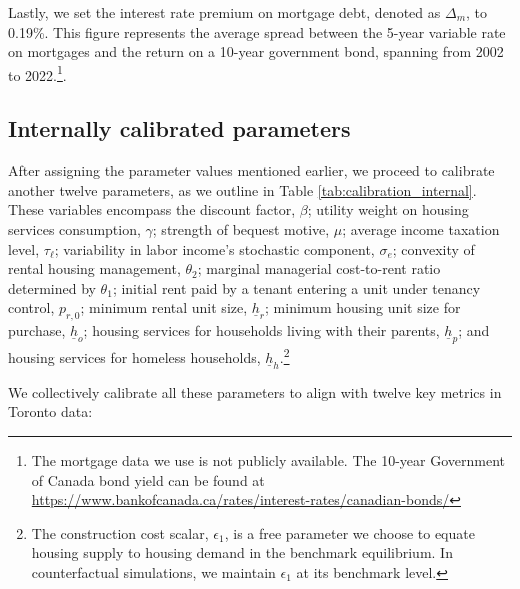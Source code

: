 \documentclass[parskip=full]{article}
\begin{document}
Lastly, we set the interest rate premium on mortgage debt, denoted as $\Delta_{m}$, to 0.19\%. This figure represents the average spread between the 5-year variable rate on mortgages and the return on a 10-year government bond, spanning from 2002 to 2022.\footnote{The mortgage data we use is not publicly available. The 10-year Government of Canada bond yield can be found at \url{https://www.bankofcanada.ca/rates/interest-rates/canadian-bonds/}}.

\subsection{Internally calibrated parameters}

After assigning the parameter values mentioned earlier, we proceed to calibrate another twelve parameters, as we outline in Table \ref{tab:calibration_internal}. These variables encompass the discount factor, $\beta$; utility weight on housing services consumption, $\gamma$; strength of bequest motive, $\mu$; average income taxation level, $\tau_{\ell}$; variability in labor income's stochastic component, $\sigma_{e}$; convexity of rental housing management, $\theta_{2}$; marginal managerial cost-to-rent ratio determined by $\theta_{1}$; initial rent paid by a tenant entering a unit under tenancy control, $p_{r,0}$; minimum rental unit size, $\underline{h}_{r}$; minimum housing unit size for purchase, $\underline{h}_{o}$; housing services for households living with their parents, $\underline{h}_{p}$; and housing services for homeless households, $\underline{h}_{h}$.\footnote{The construction cost scalar, $\epsilon_{1}$, is a free parameter we choose to equate housing supply to housing demand in the benchmark equilibrium. In counterfactual simulations, we maintain $\epsilon_{1}$ at its benchmark level.}

We collectively calibrate all these parameters to align with twelve key metrics in Toronto data:
\end{document}

